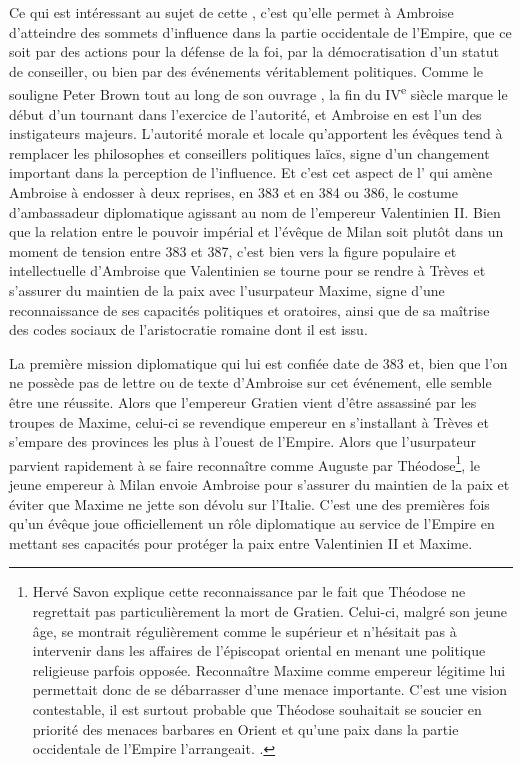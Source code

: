 Ce qui est intéressant au sujet de cette , c'est qu'elle permet à Ambroise d'atteindre des sommets d'influence dans la partie occidentale de l'Empire, que ce soit par des actions pour la défense de la foi, par la démocratisation d'un statut de conseiller, ou bien par des événements véritablement politiques. Comme le souligne Peter Brown tout au long de son ouvrage , la fin du IV\textsuperscript{e} siècle marque le début d'un tournant dans l'exercice de l'autorité, et Ambroise en est l'un des instigateurs majeurs. L'autorité morale et locale qu'apportent les évêques tend à remplacer les philosophes et conseillers politiques laïcs, signe d'un changement important dans la perception de l'influence\autocite{brown_power_1992}. Et c'est cet aspect de l' qui amène Ambroise à endosser à deux reprises, en 383 et en 384 ou 386, le costume d'ambassadeur diplomatique agissant au nom de l'empereur Valentinien II. Bien que la relation entre le pouvoir impérial et l'évêque de Milan soit plutôt dans un moment de tension entre 383 et 387, c'est bien vers la figure populaire et intellectuelle d'Ambroise que Valentinien se tourne pour se rendre à Trèves et s'assurer du maintien de la paix avec l'usurpateur Maxime, signe d'une reconnaissance de ses capacités politiques et oratoires, ainsi que de sa maîtrise des codes sociaux de l'aristocratie romaine dont il est issu.

\bigskip

La première mission diplomatique qui lui est confiée date de 383 et, bien que l'on ne possède pas de lettre ou de texte d'Ambroise sur cet événement, elle semble être une réussite. Alors que l'empereur Gratien vient d'être assassiné par les troupes de Maxime, celui-ci se revendique empereur en s'installant à Trèves et s'empare des provinces les plus à l'ouest de l'Empire. Alors que l'usurpateur parvient rapidement à se faire reconnaître comme Auguste par Théodose\footnote{Hervé Savon explique cette reconnaissance par le fait que Théodose ne regrettait pas particulièrement la mort de Gratien. Celui-ci, malgré son jeune âge, se montrait régulièrement comme le supérieur et n'hésitait pas à intervenir dans les affaires de l'épiscopat oriental en menant une politique religieuse parfois opposée. Reconnaître Maxime comme empereur légitime lui permettait donc de se débarrasser d'une menace importante. C'est une vision contestable, il est surtout probable que Théodose souhaitait se soucier en priorité des menaces barbares en Orient et qu'une paix dans la partie occidentale de l'Empire l'arrangeait. \cite[181]{savon_ambroise}.}, le jeune empereur à Milan envoie Ambroise pour s'assurer du maintien de la paix et éviter que Maxime ne jette son dévolu sur l'Italie. C'est une des premières fois qu'un évêque joue officiellement un rôle diplomatique au service de l'Empire en mettant ses capacités pour protéger la paix entre Valentinien II et Maxime.

